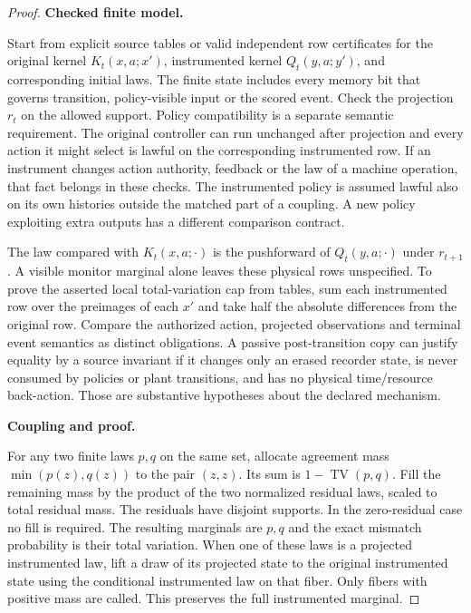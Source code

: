 \begin{proof}

\textbf{Checked finite model.}

Start from explicit source tables or valid independent row certificates for the original kernel \(K_t(x,a;x')\), instrumented kernel \(Q_t(y,a;y')\), and corresponding initial laws. The finite state includes every memory bit that governs transition, policy-visible input or the scored event. Check the projection \(r_t\) on the allowed support. Policy compatibility is a separate semantic requirement. The original controller can run unchanged after projection and every action it might select is lawful on the corresponding instrumented row. If an instrument changes action authority, feedback or the law of a machine operation, that fact belongs in these checks. The instrumented policy is assumed lawful also on its own histories outside the matched part of a coupling. A new policy exploiting extra outputs has a different comparison contract.

The law compared with \(K_t(x,a;\cdot)\) is the pushforward of \(Q_t(y,a;\cdot)\) under \(r_{t+1}\). A visible monitor marginal alone leaves these physical rows unspecified. To prove the asserted local total-variation cap from tables, sum each instrumented row over the preimages of each \(x'\) and take half the absolute differences from the original row. Compare the authorized action, projected observations and terminal event semantics as distinct obligations. A passive post-transition copy can justify equality by a source invariant if it changes only an erased recorder state, is never consumed by policies or plant transitions, and has no physical time/resource back-action. Those are substantive hypotheses about the declared mechanism.

\textbf{Coupling and proof.}

For any two finite laws \(p,q\) on the same set, allocate agreement mass \(\min(p(z),q(z))\) to the pair \((z,z)\). Its sum is \(1-\operatorname{TV}(p,q)\). Fill the remaining mass by the product of the two normalized residual laws, scaled to total residual mass. The residuals have disjoint supports. In the zero-residual case no fill is required. The resulting marginals are \(p,q\) and the exact mismatch probability is their total variation. When one of these laws is a projected instrumented law, lift a draw of its projected state to the original instrumented state using the conditional instrumented law on that fiber. Only fibers with positive mass are called. This preserves the full instrumented marginal.


\end{proof}
